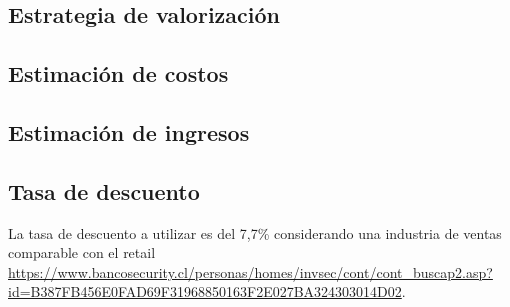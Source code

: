 \subsection{Estrategia de valorización}

\subsection{Estimación de costos}
\subsection{Estimación de ingresos}


\subsection{Tasa de descuento}
La tasa de descuento a utilizar es del 7,7\% considerando una industria de ventas comparable con el retail \url{https://www.bancosecurity.cl/personas/homes/invsec/cont/cont_buscap2.asp?id=B387FB456E0FAD69F31968850163F2E027BA324303014D02}.
